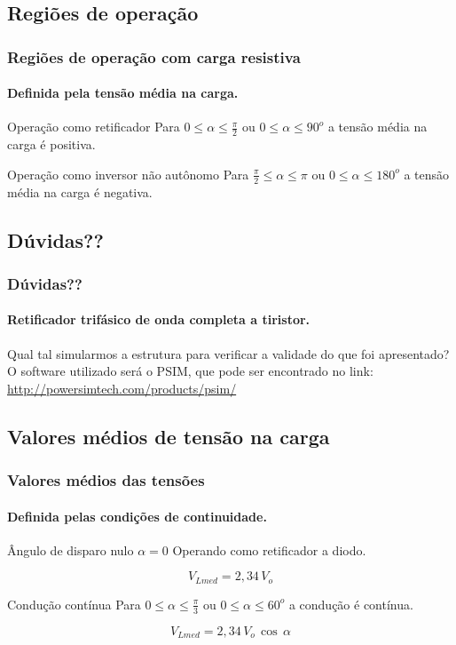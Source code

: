 \documentclass[aspectratio=43]{beamer}
\begin{document}
\subsection{Regiões de operação}
\begin{frame}
	\frametitle{Regiões de operação com carga resistiva}
	\framesubtitle{Definida pela tensão média na carga.}
	\begin{block}{Operação como retificador}
		Para $ 0 \le \alpha \le \frac{\pi}{2}$ ou $ 0 \le \alpha \le 90^o$ a tensão média na carga é positiva.
	\end{block}
	\begin{block}{Operação como inversor não autônomo}
		Para $ \frac{\pi}{2} \le \alpha \le \pi$ ou $ 0 \le \alpha \le 180^o$ a tensão média na carga é negativa.
	\end{block}
\end{frame}


\subsection{Dúvidas??}
\begin{frame}
	\frametitle{Dúvidas??}
	\framesubtitle{Retificador trifásico de onda completa a tiristor.}
	\begin{block}{Qual tal simularmos a estrutura para verificar a validade do que foi apresentado?}
		O software utilizado será o PSIM, que pode ser encontrado no link:
		\url{http://powersimtech.com/products/psim/}
	\end{block}

\end{frame}




\subsection{Valores médios de tensão na carga}
\begin{frame}
	\frametitle{Valores médios das tensões}
	\framesubtitle{Definida pelas condições de continuidade.}
		\begin{block}{Ângulo de disparo nulo $\alpha = 0$}
		   Operando como retificador a diodo.
		\end{block}
			\begin{equation}
				{V_{Lmed}} = 2,34\,{V_o}
			\end{equation}
	
	\begin{block}{Condução contínua}
		Para $ 0 \le \alpha \le \frac{\pi}{3}$ ou $ 0 \le \alpha \le 60^o$ a condução é contínua.
	\end{block}
	
	
	\begin{equation}
     {V_{Lmed}} = 2,34\,{V_o}\,\cos \,\alpha 
	\end{equation}

\end{frame}
\end{document}
